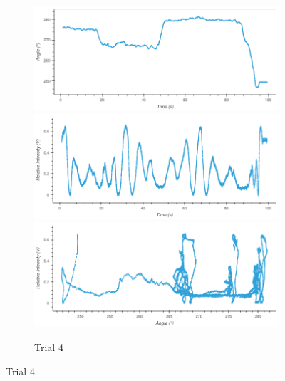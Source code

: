 \begin{figure}
\begin{subfigure}{1.0\textwidth}
\caption{Trial 4}
\includegraphics[width=\plotwidth]{plots/t4-time-angle.png}
\includegraphics[width=\plotwidth]{plots/t4-time-intensity.png}
\includegraphics[width=\plotwidth]{plots/t4-angle-intensity.png}
\end{subfigure}




\end{figure}
